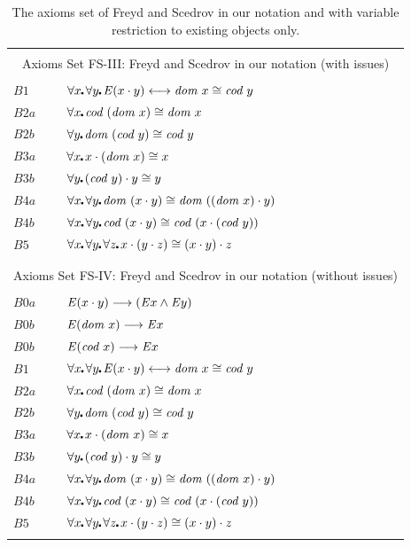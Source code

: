 \begin{table} \centering \normalsize
\begin{tabular}{ll}
\hline
\\
\multicolumn{2}{c}{Axioms Set FS-III: Freyd and Scedrov in our notation (with issues)} \\
\\
  $B1$  & $\all{x}\all{y} \ex (x \comp y) \longleftrightarrow \dom x \cong \cod y$ \\
  $B2a$ & $\all{x} \cod(\dom x) \cong \dom x$ \\  
  $B2b$ & $\all{y} \dom(\cod y) \cong \cod y$ \\  
  $B3a$  & $\all{x} x \comp (\dom x) \cong x$ \\ 
  $B3b$ & $\all{y} (\cod y) \comp y \cong y$ \\
  $B4a$ & $\all{x}\all{y} \dom(x \comp y) \cong \dom((\dom x) \comp y)$ \\ 
  $B4b$ & $\all{x}\all{y} \cod(x \comp y) \cong \cod(x \comp (\cod y))$ \\ 
  $B5$   & $\all{x}\all{y}\all{z} x \comp (y \comp z) \cong  (x \comp y) \comp z$   \\
\\
\hline
\\
\multicolumn{2}{c}{Axioms Set FS-IV: Freyd and Scedrov in our
  notation (without issues)} \\
\\
 $B0a$ & $\mathit{E} (x \cdot y) \longrightarrow  (\mathit{E} x \wedge \mathit{E} y)$ \\
 $B0b$ & $\mathit{E} (\textit{dom \/} x)  \longrightarrow   \mathit{E} x$ \\
 $B0b$ & $\mathit{E} (\textit{cod \/} x)  \longrightarrow   \mathit{E} x$ \\
  $B1$  & $\all{x}\all{y} \ex (x \comp y) \longleftrightarrow \dom x \cong \cod y$ \\
  $B2a$ & $\all{x} \cod(\dom x) \cong \dom x$ \\  
  $B2b$ & $\all{y} \dom(\cod y) \cong \cod y$ \\  
  $B3a$  & $\all{x} x \comp (\dom x) \cong x$ \\ 
  $B3b$ & $\all{y} (\cod y) \comp y \cong y$ \\
  $B4a$ & $\all{x}\all{y} \dom(x \comp y) \cong \dom((\dom x) \comp y)$ \\ 
  $B4b$ & $\all{x}\all{y} \cod(x \comp y) \cong \cod(x \comp (\cod y))$ \\ 
  $B5$   & $\all{x}\all{y}\all{z} x \comp (y \comp z) \cong  (x \comp y) \comp z$   \\
\\
\hline
\end{tabular}
\caption{The axioms set of Freyd and Scedrov in our
  notation and with variable restriction to existing objects only.\label{axioms-sets-4}}
\end{table}

